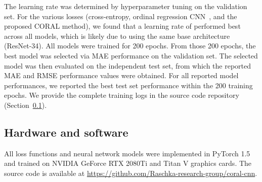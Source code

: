\documentclass[times,twocolumn,final,authoryear]{elsarticle}
\begin{document}
The learning rate was determined by hyperparameter tuning on the validation set. For the various losses (cross-entropy, ordinal regression CNN~\citep{niu2016ordinal}, and the proposed CORAL method), we found that a learning rate of  performed best across all models, which is likely due to using the same base architecture (ResNet-34). All models were trained for 200 epochs. From those 200 epochs, the best model was selected via MAE performance on the validation set. The selected model was then evaluated on the independent test set, from which the reported MAE and RMSE performance values were obtained. For all reported model performances, we reported the best test set performance within the 200 training epochs. We provide the complete training logs in the source code repository (Section~\ref{sec:hardware-and-software}).



\subsection{Hardware and software}
\label{sec:hardware-and-software}
All loss functions and neural network models were implemented in PyTorch 1.5~\citep{paszke2019pytorch} and trained on NVIDIA GeForce RTX 2080Ti and Titan V graphics cards. The source code is available at \url{https://github.com/Raschka-research-group/coral-cnn}.
\end{document}
